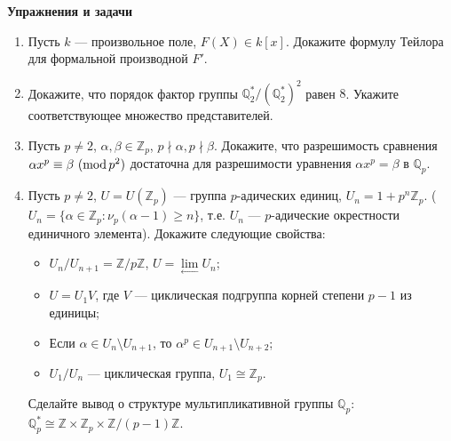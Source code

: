 \noindent\textbf{Упражнения и задачи}
\begin{enumerate}[topsep=0pt]

    \item Пусть $k$ --- произвольное поле, $F(X) \in k[x]$. Докажите формулу Тейлора для формальной производной $F'$.

    \item Докажите, что порядок фактор группы $\mathbb{Q}_2^*/(\mathbb{Q}_2^*)^2$ равен $8$. Укажите соответствующее множество представителей.

    \item Пусть $p \neq 2$, $\alpha, \beta \in \mathbb{Z}_p$, $p \nmid \alpha, p \nmid \beta$. Докажите, что разрешимость сравнения $\alpha x^p \equiv \beta\ (\operatorname{mod} p^2)$ достаточна для разрешимости уравнения $\alpha x^p = \beta$ в $\mathbb{Q}_p$. %

    \item Пусть $p \neq 2$, $U=U(\mathbb{Z}_p)$ --- группа $p$-адических единиц, $U_n = 1+p^n \mathbb{Z}_p$. ($U_n = \{\alpha \in \mathbb{Z}_p: \nu_p(\alpha - 1) \geqslant n \}$, т.е. $U_n$ --- $p$-адические окрестности единичного элемента). Докажите следующие свойства:
    \begin{itemize}[topsep=0pt]
        \item $U_n/U_{n+1} = \mathbb{Z}/p\mathbb{Z}$, $U=\lim\limits_{\longleftarrow} U_n$;
        \item $U=U_1 V$, где $V$ --- циклическая подгруппа корней степени $p-1$ из единицы;
        \item Если $\alpha \in U_n \setminus U_{n+1}$, то $\alpha^p \in U_{n+1} \setminus U_{n+2}$;
        \item $U_1/U_n$ --- циклическая группа, $U_1 \cong \mathbb{Z}_p$.
    \end{itemize} 
    Сделайте вывод о структуре мультипликативной группы $\mathbb{Q}_p$: $\mathbb{Q}_p^* \cong \mathbb{Z} \times \mathbb{Z}_p \times \mathbb{Z}/(p-1)\mathbb{Z}$.


\end{enumerate}
